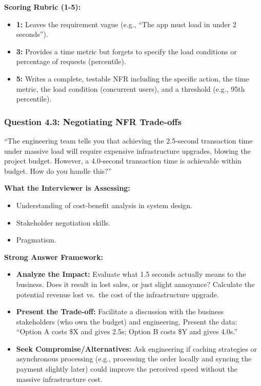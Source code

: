 \documentclass[
  11pt,
  openany,
  oneside]{book}
\providecommand{\tightlist}{%
  \setlength{\itemsep}{0pt}\setlength{\parskip}{0pt}}
\begin{document}
\textbf{Scoring Rubric (1-5):}

\begin{itemize}
\tightlist
\item
  \textbf{1:} Leaves the requirement vague (e.g., ``The app must load in
  under 2 seconds'').
\item
  \textbf{3:} Provides a time metric but forgets to specify the load
  conditions or percentage of requests (percentile).
\item
  \textbf{5:} Writes a complete, testable NFR including the specific
  action, the time metric, the load condition (concurrent users), and a
  threshold (e.g., 95th percentile).
\end{itemize}

\subsubsection{Question 4.3: Negotiating NFR
Trade-offs}\label{question-4.3-negotiating-nfr-trade-offs}

``The engineering team tells you that achieving the 2.5-second
transaction time under massive load will require expensive
infrastructure upgrades, blowing the project budget. However, a
4.0-second transaction time is achievable within budget. How do you
handle this?''

\textbf{What the Interviewer is Assessing:}

\begin{itemize}
\tightlist
\item
  Understanding of cost-benefit analysis in system design.
\item
  Stakeholder negotiation skills.
\item
  Pragmatism.
\end{itemize}

\textbf{Strong Answer Framework:}

\begin{itemize}
\tightlist
\item
  \textbf{Analyze the Impact:} Evaluate what 1.5 seconds actually means
  to the business. Does it result in lost sales, or just slight
  annoyance? Calculate the potential revenue lost vs.~the cost of the
  infrastructure upgrade.
\item
  \textbf{Present the Trade-off:} Facilitate a discussion with the
  business stakeholders (who own the budget) and engineering. Present
  the data: ``Option A costs \$X and gives 2.5s; Option B costs \$Y and
  gives 4.0s.''
\item
  \textbf{Seek Compromise/Alternatives:} Ask engineering if caching
  strategies or asynchronous processing (e.g., processing the order
  locally and syncing the payment slightly later) could improve the
  perceived speed without the massive infrastructure cost.
\end{itemize}
\end{document}
